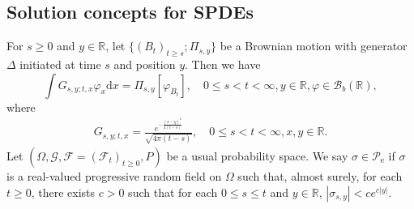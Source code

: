 \documentclass[12pt,a4paper]{amsart}
\numberwithin{equation}{section}
\theoremstyle{plain}
\theoremstyle{remark}
\begin{document}
\subsection{Solution concepts for SPDEs} \label{sec:SPDE}
For $s\geq 0$ and $y\in \mathbb R$, let $\{(B_t)_{t\geq s};\Pi_{s,y}\}$ be a Brownian motion with generator $\Delta$ initiated at time $s$ and position $y$.
Then we have
\[
\int G_{s,y;t,x} \varphi_x\mathrm dx = \Pi_{s,y}[\varphi_{B_t}], \quad 0\leq s<t<\infty, y \in \mathbb R, \varphi \in \mathcal B_b(\mathbb R),
\] 
where
\begin{align} 
	G_{s,y;t,x} = \frac{e^{-\frac{(x-y)^2}{4(t-s)}}}{\sqrt{4\pi (t-s)}}, \quad 0\leq s < t< \infty, x,y\in \mathbb R.
\end{align}
Let $(\Omega, \mathcal G, \mathcal F = (\mathcal F_t)_{t\geq 0}, P)$ be a usual probability space.
We say $\sigma \in \mathscr P_\mathrm e$ if $\sigma$ is a real-valued progressive random field on $\Omega$ such that, almost surely, for each $t\geq 0$, there exists $c>0$ such that for each $0\leq s\leq t$ and $y\in \mathbb R$,
$  |\sigma_{s,y}| < ce^{c|y|}$.
\end{document}
